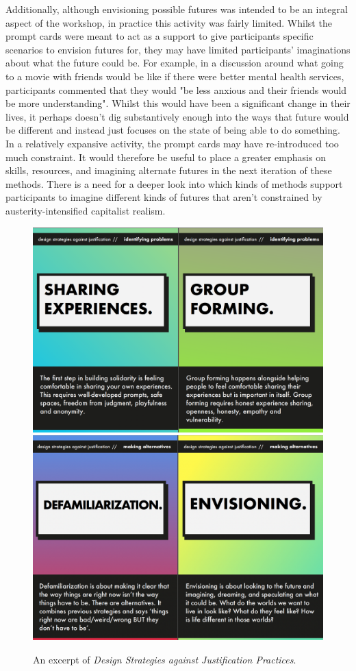 Additionally, although envisioning possible futures was intended to be an integral aspect of the workshop, in practice this activity was fairly limited. Whilst the prompt cards were meant to act as a support to give participants specific scenarios to envision futures for, they may have limited participants' imaginations about what the future could be. For example, in a discussion around what going to a movie with friends would be like if there were better mental health services, participants commented that they would "be less anxious and their friends would be more understanding". Whilst this would have been a significant change in their lives, it perhaps doesn't dig substantively enough into the ways that future would be different and instead just focuses on the state of being able to do something. In a relatively expansive activity, the prompt cards may have re-introduced too much constraint. It would therefore be useful to place a greater emphasis on skills, resources, and imagining alternate futures in the next iteration of these methods. There is a need for a deeper look into which kinds of methods support participants to imagine different kinds of futures that aren't constrained by austerity-intensified capitalist realism. 
\begin{figure}
    \centering
    \includegraphics[width=1\linewidth
]{Images/7/design-strats-1.png}
    \includegraphics[width=1\linewidth]{Images/7/design-strats-2.png}
    \caption{An excerpt of \textit{Design Strategies against Justification Practices}.}
    \label{fig:design-strats}
\end{figure}
